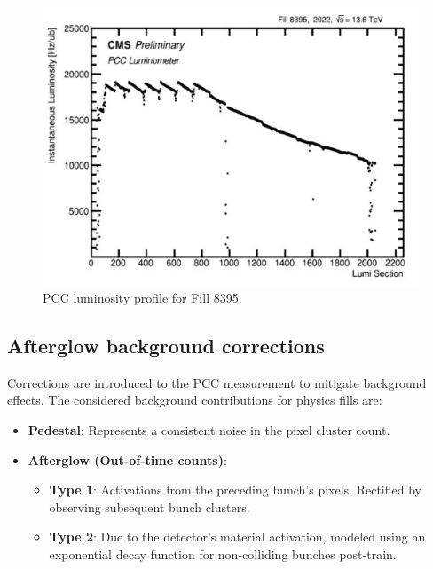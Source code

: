 \begin{figure}[!htp]
\centering
\includegraphics[width=1\textwidth]{ashish_thesis/Fill_profile_8274_1.png}
\caption[Fill 8274 Luminosity Profile]{%
  PCC luminosity profile for Fill 8395.
}
\label{fig:period_bound_111}
\end{figure}

\newpage
\subsection{Afterglow background corrections}


Corrections are introduced to the PCC measurement to mitigate background effects. The considered background contributions for physics fills are:

\begin{itemize}
    \item \textbf{Pedestal}: Represents a consistent noise in the pixel cluster count.
    
    \item \textbf{Afterglow (Out-of-time counts)}:
    \begin{itemize}
        \item \textbf{Type 1}: Activations from the preceding bunch's pixels. Rectified by observing subsequent bunch clusters.
        
        \item \textbf{Type 2}: Due to the detector's material activation, modeled using an exponential decay function for non-colliding bunches post-train.
    \end{itemize}
\end{itemize}

